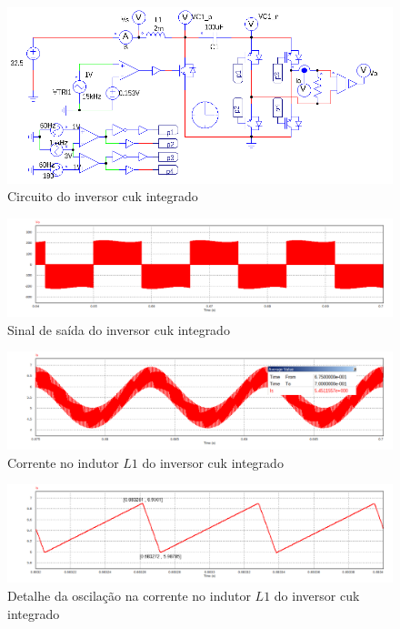 \documentclass[
	12pt,				%
	openany,
	onseside,
	a4paper,			%
	english,			%
	french,				%
	spanish,			%
	brazil,				%
	]{abntex2}
\begin{document}
\begin{figure}[htbp]%
	\begin{center}%
		\includegraphics[width= \linewidth]{integ_cuk_circ_psim}
		\caption{Circuito do inversor cuk integrado}
		\label{fig:integ_cuk_met}
	\end{center}
\end{figure}

\begin{figure}[htb]%
	\centering
		\includegraphics[width= \linewidth]{cuk_integ_Vout}
		\caption{Sinal de saída do inversor cuk integrado}
		\label{fig:cuk_integ_ripp_V_out}
\end{figure}

\begin{figure}[htb]%
	\centering
		\includegraphics[width= \linewidth]{cuk_integ_IL1}
		\caption{Corrente no indutor $L1$ do inversor cuk integrado}
		\label{fig:cuk_integ_I_L1}
\end{figure}

\begin{figure}[htb]%
	\centering
		\includegraphics[width= \linewidth]{cuk_integ_ripp_IL1}
		\caption{Detalhe da oscilação na corrente no indutor $L1$ do inversor cuk integrado}
		\label{fig:cuk_integ_ripp_I_L1}
\end{figure}
\end{document}
